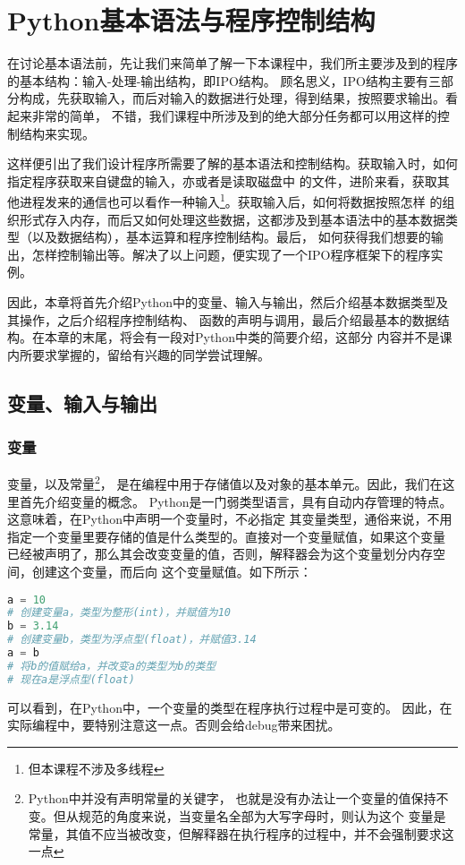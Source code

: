 \chapter{Python基本语法与程序控制结构}
\lstset{style=Python}
在讨论基本语法前，先让我们来简单了解一下本课程中，我们所主要涉及到的程序的基本结构：输入-处理-输出结构，即IPO结构。
顾名思义，IPO结构主要有三部分构成，先获取输入，而后对输入的数据进行处理，得到结果，按照要求输出。看起来非常的简单，
不错，我们课程中所涉及到的绝大部分任务都可以用这样的控制结构来实现。

这样便引出了我们设计程序所需要了解的基本语法和控制结构。获取输入时，如何指定程序获取来自键盘的输入，亦或者是读取磁盘中
的文件，进阶来看，获取其他进程发来的通信也可以看作一种输入\footnote{但本课程不涉及多线程}。获取输入后，如何将数据按照怎样
的组织形式存入内存，而后又如何处理这些数据，这都涉及到基本语法中的基本数据类型（以及数据结构），基本运算和程序控制结构。最后，
如何获得我们想要的输出，怎样控制输出等。解决了以上问题，便实现了一个IPO程序框架下的程序实例。

因此，本章将首先介绍Python中的变量、输入与输出，然后介绍基本数据类型及其操作，之后介绍程序控制结构、
函数的声明与调用，最后介绍最基本的数据结构。在本章的末尾，将会有一段对Python中类的简要介绍，这部分
内容并不是课内所要求掌握的，留给有兴趣的同学尝试理解。
\section{变量、输入与输出}
\subsection{变量}
变量，以及常量\footnote{Python中并没有声明常量的关键字，
也就是没有办法让一个变量的值保持不变。但从规范的角度来说，当变量名全部为大写字母时，则认为这个
变量是常量，其值不应当被改变，但解释器在执行程序的过程中，并不会强制要求这一点}，
是在编程中用于存储值以及对象的基本单元。因此，我们在这里首先介绍变量的概念。
Python是一门弱类型语言，具有自动内存管理的特点。这意味着，在Python中声明一个变量时，不必指定
其变量类型，通俗来说，不用指定一个变量里要存储的值是什么类型的。直接对一个变量赋值，如果这个变量
已经被声明了，那么其会改变变量的值，否则，解释器会为这个变量划分内存空间，创建这个变量，而后向
这个变量赋值。如下所示：

\begin{lstlisting}[language=Python]
a = 10
# 创建变量a，类型为整形(int)，并赋值为10
b = 3.14
# 创建变量b，类型为浮点型(float)，并赋值3.14
a = b
# 将b的值赋给a，并改变a的类型为b的类型
# 现在a是浮点型(float)
\end{lstlisting}
可以看到，在Python中，一个变量的类型在程序执行过程中是可变的。
因此，在实际编程中，要特别注意这一点。否则会给debug带来困扰。


